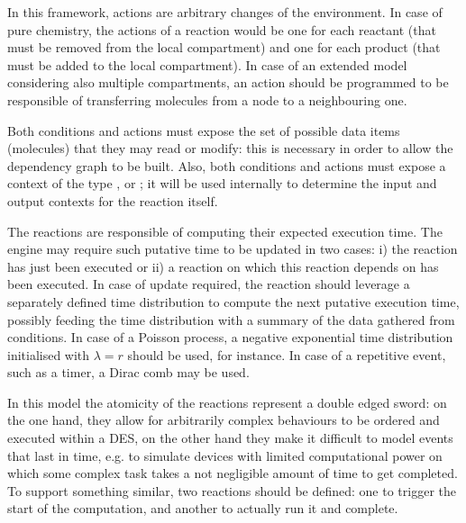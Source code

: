 \documentclass[12pt,a4paper,twoside,openright]{book}
\begin{document}
In this framework, actions are arbitrary changes of the environment.
%
In case of pure chemistry, the actions of a reaction would be one for each reactant (that must be removed from the local compartment) and one for each product (that must be added to the local compartment).
%
In case of an extended model considering also multiple compartments, an action should be programmed to be responsible of transferring molecules from a node to a neighbouring one.

Both conditions and actions must expose the set of possible data items (molecules) that they may read or modify: this is necessary in order to allow the dependency graph to be built.
%
Also, both conditions and actions must expose a context of the type \localc{}, \neighborhood{} or \globalc{}; it will be used internally to determine the input and output contexts for the reaction itself.

The reactions are responsible of computing their expected execution time.
%
The engine may require such putative time to be updated in two cases: i) the reaction has just been executed or ii) a reaction on which this reaction depends on has been executed.
%
In case of update required, the reaction should leverage a separately defined time distribution to compute the next putative execution time, possibly feeding the time distribution with a summary of the data gathered from conditions.
%
In case of a Poisson process, a negative exponential time distribution initialised with $\lambda{} = r$ should be used, for instance.
%
In case of a repetitive event, such as a timer, a Dirac comb may be used.

In this model the atomicity of the reactions represent a double edged sword: on the one hand, they allow for arbitrarily complex behaviours to be ordered and executed within a DES, on the other hand they make it difficult to model events that last in time, e.g. to simulate devices with limited computational power on which some complex task takes a not negligible amount of time to get completed.
%
To support something similar, two reactions should be defined: one to trigger the start of the computation, and another to actually run it and complete.
\end{document}
